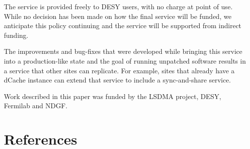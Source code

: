 \documentclass[a4paper]{jpconf}
\begin{document}
The service is provided freely to DESY users, with no charge at point
of use.  While no decision has been made on how the final service will
be funded, we anticipate this policy continuing and the service will
be supported from indirect funding.

The improvements and bug-fixes that were developed while bringing this
service into a production-like state and the goal of running unpatched
software results in a service that other sites can replicate.  For
example, sites that already have a dCache instance can extend that
service to include a sync-and-share service.

\ack

Work described in this paper was funded by the LSDMA project, DESY,
Fermilab and NDGF.

\section*{References}

\end{document}
